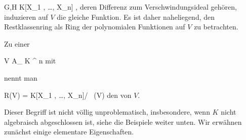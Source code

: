 \mavergleichskette
{\vergleichskette
{ G,H
}
{ \in }{ K[X_1 , \ldots ,  X_n]
}
{  }{
}
{    }{
}
{   }{
}
}
{}{}{,}
deren Differenz zum Verschwindungsideal gehören, induzieren auf $V$ die gleiche Funktion. Es ist daher naheliegend, den Restklassenring
 als Ring der polynomialen
 {} {}
Funktionen auf $V$ zu betrachten.


{}
{





Zu einer

\mavergleichskette
{\vergleichskette
{V
}
{ \subseteq }{ { {\mathbb A}_{  K }^{  n   } }
}
{  }{
}
{    }{
}
{   }{
}
}
{}{}{}
mit

 nennt man

\mavergleichskette
{\vergleichskette
{R(V)
}
{ = }{ K[X_1 , \ldots ,  X_n]/ \, (V)
}
{  }{
}
{    }{
}
{   }{
}
}
{}{}{}
den  von $V$.





}

Dieser Begriff ist nicht völlig unproblematisch, insbesondere, wenn $K$ nicht algebraisch abgeschlossen ist, siehe die Beispiele weiter unten. Wir erwähnen zunächst einige elementare Eigenschaften.





